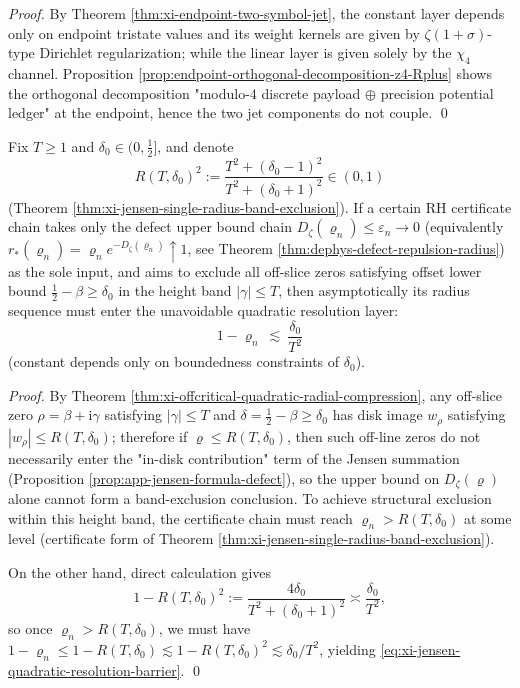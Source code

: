 \begin{proof}
By Theorem \ref{thm:xi-endpoint-two-symbol-jet}, the constant layer depends only on endpoint tristate values and its weight kernels are given by \(\zeta(1+\sigma)\)-type Dirichlet regularization; while the linear layer is given solely by the \(\chi_4\) channel.
Proposition \ref{prop:endpoint-orthogonal-decomposition-z4-Rplus} shows the orthogonal decomposition "modulo-\(4\) discrete payload \(\oplus\) precision potential ledger" at the endpoint, hence the two jet components do not couple. \qed
\end{proof}

\begin{theorem}\label{thm:xi-jensen-quadratic-resolution-barrier}
Fix \(T\ge 1\) and \(\delta_0\in(0,\tfrac12]\), and denote
\[
R(T,\delta_0)^2:=\frac{T^2+(\delta_0-1)^2}{T^2+(\delta_0+1)^2}\in(0,1)
\]
(Theorem \ref{thm:xi-jensen-single-radius-band-exclusion}).
If a certain RH certificate chain takes only the defect upper bound chain \(D_\zeta(\varrho_n)\le \varepsilon_n\to 0\) (equivalently \(r_\ast(\varrho_n)=\varrho_n e^{-D_\zeta(\varrho_n)}\uparrow 1\), see Theorem \ref{thm:dephys-defect-repulsion-radius}) as the sole input,
and aims to exclude all off-slice zeros satisfying offset lower bound \(\tfrac12-\beta\ge\delta_0\) in the height band \(|\gamma|\le T\),
then asymptotically its radius sequence must enter the unavoidable quadratic resolution layer:
\begin{equation}\label{eq:xi-jensen-quadratic-resolution-barrier}
\boxed{\;
1-\varrho_n\ \lesssim\ \frac{\delta_0}{T^2}\;}
\end{equation}
(constant depends only on boundedness constraints of \(\delta_0\)).
\end{theorem}

\begin{proof}
By Theorem \ref{thm:xi-offcritical-quadratic-radial-compression},
any off-slice zero \(\rho=\beta+\mathrm{i}\gamma\) satisfying \(|\gamma|\le T\) and \(\delta=\tfrac12-\beta\ge\delta_0\) has disk image \(w_\rho\) satisfying
\(|w_\rho|\le R(T,\delta_0)\);
therefore if \(\varrho\le R(T,\delta_0)\), then such off-line zeros do not necessarily enter the "in-disk contribution" term of the Jensen summation (Proposition \ref{prop:app-jensen-formula-defect}), so the upper bound on \(D_\zeta(\varrho)\) alone cannot form a band-exclusion conclusion.
To achieve structural exclusion within this height band, the certificate chain must reach \(\varrho_n>R(T,\delta_0)\) at some level (certificate form of Theorem \ref{thm:xi-jensen-single-radius-band-exclusion}).
\par
On the other hand, direct calculation gives
\[
1-R(T,\delta_0)^2
:=\frac{4\delta_0}{T^2+(\delta_0+1)^2}
\asymp \frac{\delta_0}{T^2},
\]
so once \(\varrho_n>R(T,\delta_0)\), we must have
\(
1-\varrho_n\le 1-R(T,\delta_0)\lesssim 1-R(T,\delta_0)^2\lesssim \delta_0/T^2
\),
yielding \eqref{eq:xi-jensen-quadratic-resolution-barrier}. \qed
\end{proof}

